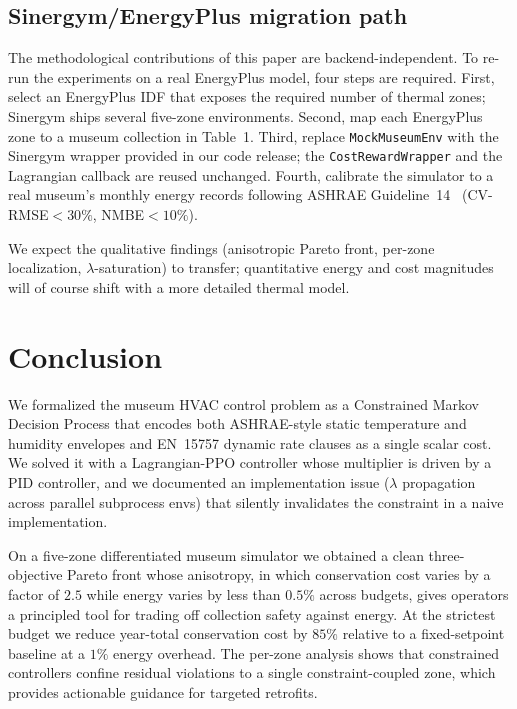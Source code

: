 \documentclass[11pt,a4paper]{article}
\begin{document}
\subsection{Sinergym/EnergyPlus migration path}

The methodological contributions of this paper are
backend-independent. To re-run the experiments on a real EnergyPlus
model, four steps are required. First, select an EnergyPlus IDF that
exposes the required number of thermal zones; Sinergym ships several
five-zone environments. Second, map each EnergyPlus zone to a museum
collection in Table~1. Third, replace
\texttt{MockMuseumEnv} with the Sinergym wrapper provided in our code
release; the \texttt{CostRewardWrapper} and the Lagrangian callback
are reused unchanged. Fourth, calibrate the simulator to a real
museum's monthly energy records following ASHRAE
Guideline~14~\citep{ashrae_guideline14} (CV-RMSE${<}30\%$,
NMBE${<}10\%$).

We expect the qualitative findings (anisotropic Pareto front, per-zone
localization, $\lambda$-saturation) to transfer; quantitative energy
and cost magnitudes will of course shift with a more detailed thermal
model.

\section{Conclusion}\label{sec:conclusion}

We formalized the museum HVAC control problem as a Constrained
Markov Decision Process that encodes both ASHRAE-style static
temperature and humidity envelopes and EN~15757 dynamic rate clauses
as a single scalar cost. We solved it with a Lagrangian-PPO
controller whose multiplier is driven by a PID controller, and we
documented an implementation issue ($\lambda$ propagation across
parallel subprocess envs) that silently invalidates the constraint
in a naive implementation.

On a five-zone differentiated museum simulator we obtained a clean
three-objective Pareto front whose anisotropy, in which conservation
cost varies by a factor of $2.5$ while energy varies by less than
$0.5\%$ across budgets, gives operators a principled tool for trading
off collection safety against energy. At the strictest budget we
reduce year-total conservation cost by $85\%$ relative to a
fixed-setpoint baseline at a $1\%$ energy overhead. The per-zone
analysis shows that constrained controllers confine residual
violations to a single constraint-coupled zone, which provides
actionable guidance for targeted retrofits.
\end{document}
